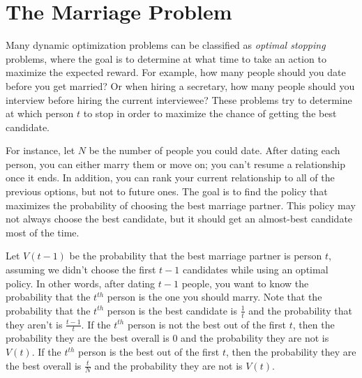 
\section*{The Marriage Problem} %

Many dynamic optimization problems can be classified as \emph{optimal stopping} problems, where the goal is to determine at what time to take an action to maximize the expected reward.
For example, how many people should you date before you get married?
Or when hiring a secretary, how many people should you interview before hiring the current interviewee?
These problems try to determine at which person $t$ to stop in order to maximize the chance of getting the best candidate.

For instance, let $N$ be the number of people you could date.
After dating each person, you can either marry them or move on; you can't resume a relationship once it ends.
In addition, you can rank your current relationship to all of the previous options, but not to future ones.
The goal is to find the policy that maximizes the probability of choosing the best marriage partner.
This policy may not always choose the best candidate, but it should get an almost-best candidate most of the time.

Let $V(t-1)$ be the probability that the best marriage partner is person $t$, assuming we didn't choose the first $t-1$ candidates while using an optimal policy.
In other words, after dating $t-1$ people, you want to know the probability that the $t^{th}$ person is the one you should marry.
Note that the probability that the $t^{th}$ person is the best candidate is $\frac{1}{t}$ and the probability that they aren't is $\frac{t-1}{t}$.
If the $t^{th}$ person is not the best out of the first $t$, then the probability they are the best overall is 0 and the probability they are not is $V(t)$.
If the $t^{th}$ person is the best out of the first $t$, then the probability they are the best overall is $\frac{t}{N}$ and the probability they are not is $V(t)$.

